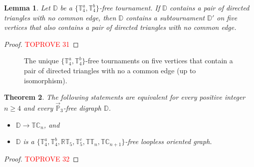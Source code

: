 \documentclass{article}
\newtheorem{theorem}{Theorem}
\newtheorem{lemma}[theorem]{Lemma}
\theoremstyle{definition}
\theoremstyle{remark}
\newcommand{\bC}{{\mathbb C}}
\newcommand{\bD}{{\mathbb D}}
\newcommand{\bP}{{\mathbb P}}
\newcommand{\bR}{{\mathbb R}}
\newcommand{\bT}{{\mathbb T}}
\begin{document}
\begin{lemma}\label{lem:2-triangles}
    Let $\bD$ be a $\{\bT_4^a, \bT_4^b\}$-free tournament. If $\bD$ contains a pair of directed triangles
    with no common edge, then $\bD$ contains a subtournament $\bD'$ on five vertices that
    also contains a pair of directed triangles with no common edge. 
\end{lemma}
\begin{proof}\textcolor{red}{TOPROVE 31}\end{proof}

\begin{figure}[ht!]
\centering
{}
\caption{The unique $\{\bT_4^a,\bT_4^b\}$-free tournaments on five vertices that contain a pair
of directed triangles with no a common edge (up to isomorphism).}
\label{fig:tournaments-5-vertices}
\end{figure}


\begin{theorem}\label{thm:TCn-min-obs}
    The following statements are equivalent for 
    every positive integer $n\ge 4$ and every $\vec{\bP}_3$-free digraph
    $\bD$.
    \begin{itemize}
        \item $\bD \to \bT\bC_n$, and
        \item $\bD$ is a $\{\bT_4^a,\bT_4^b, \bR\bT_5, \bT_5^c, \bT\bT_n,\bT\bC_{n+1}\}$-free
        loopless oriented graph.
    \end{itemize}
\end{theorem}
\begin{proof}\textcolor{red}{TOPROVE 32}\end{proof}
\end{document}
